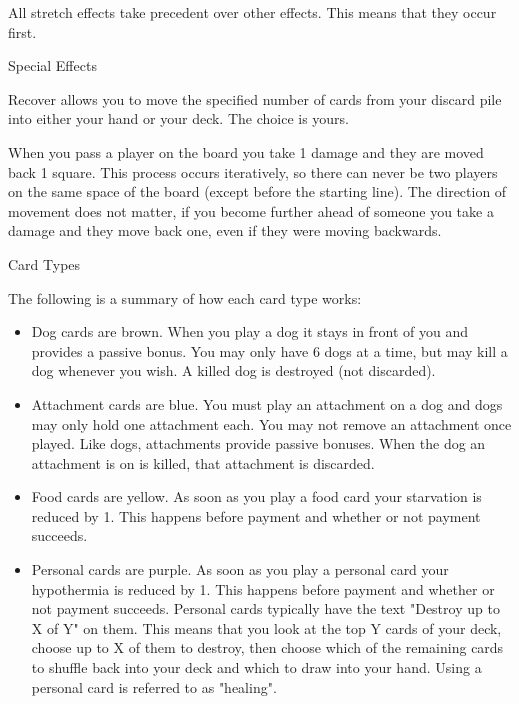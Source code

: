 \documentclass{article}
\begin{document}
\begin{multicols}{3}
    All stretch effects take precedent over other effects. This means that they
    occur first.

{\noindent\fontsize{18}{18}\Racing Special Effects\par}

    Recover allows you to move the specified number of cards from your discard
    pile into either your hand or your deck. The choice is yours.

    When you pass a player on the board you take 1 damage and they are moved
    back 1 square. This process occurs iteratively, so there can never be two
    players on the same space of the board (except before the starting line).
    The direction of movement does not matter, if you become further ahead of
    someone you take a damage and they move back one, even if they were moving
    backwards.

{\noindent\fontsize{18}{18}\Racing Card Types\par}

    The following is a summary of how each card type works:

    \begin{itemize}
        \item Dog cards are brown. When you play a dog it stays in front of you
            and provides a passive bonus. You may only have 6 dogs at a time,
            but may kill a dog whenever you wish. A killed dog is destroyed (not
            discarded).

        \item Attachment cards are blue. You must play an attachment on a dog
            and dogs may only hold one attachment each. You may not remove an
            attachment once played. Like dogs, attachments provide passive
            bonuses. When the dog an attachment is on is killed, that attachment
            is discarded.

        \item Food cards are yellow. As soon as you play a food card your
            starvation is reduced by 1. This happens before payment and whether
            or not payment succeeds.

        \item Personal cards are purple. As soon as you play a personal card
            your hypothermia is reduced by 1. This happens before payment and
            whether or not payment succeeds. Personal cards typically have the
            text "Destroy up to X of Y" on them. This means that you look at the
            top Y cards of your deck, choose up to X of them to destroy, then
            choose which of the remaining cards to shuffle back into your deck
            and which to draw into your hand. Using a personal card is referred
            to as "healing".


\end{itemize}
\end{multicols}
\end{document}
